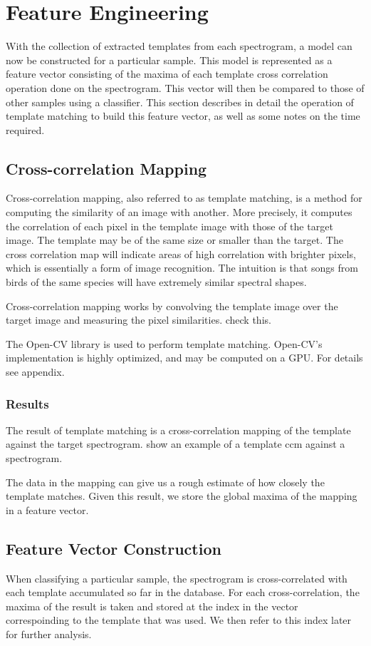 \section{Feature Engineering}
With the collection of extracted templates from each spectrogram,
a model can now be constructed for a particular sample.
This model is represented as a feature vector consisting of the maxima
of each template cross correlation operation done on the spectrogram.
This vector will then be compared to those of other samples using a
classifier.
This section describes in detail the operation of template matching
to build this feature vector, as well as some notes on the time
required.

\subsection{Cross-correlation Mapping}
Cross-correlation mapping, also referred to as template matching, is
a method for computing the similarity of an image with another.
More precisely, it computes the correlation of each pixel in the template image
with those of the target image.
The template may be of the same size or smaller than the target.
The cross correlation map will indicate areas of high correlation with brighter
pixels, which is essentially a form of image recognition.
The intuition is that songs from birds of the same species will have
extremely similar spectral shapes.

Cross-correlation mapping works by convolving the template image
over the target image and measuring the pixel similarities.
check this.

The Open-CV library is used to perform template matching.
Open-CV's implementation is highly optimized, and may be computed on a GPU.
For details see appendix.

\subsubsection{Results}
The result of template matching is a cross-correlation mapping of the
template against the target spectrogram.
show an example of a template ccm against a spectrogram.

The data in the mapping can give us a rough estimate of how closely
the template matches.
Given this result, we store the global maxima of the mapping in a
feature vector.

\subsection{Feature Vector Construction}
When classifying a particular sample, the spectrogram is cross-correlated
with each template accumulated so far in the database.
For each cross-correlation, the maxima of the result is taken and stored
at the index in the vector correspoinding to the template that was used.
We then refer to this index later for further analysis.

